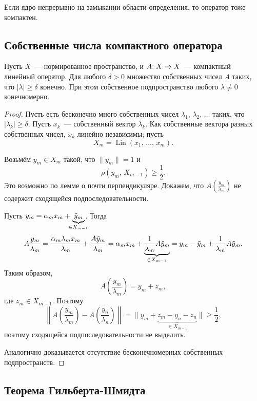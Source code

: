 \documentclass{notes}
\DeclareMathOperator{\Lin}{Lin}
\begin{document}
	\begin{exm}
		Если ядро непрерывно на замыкании области определения, то оператор тоже компактен.
	\end{exm}

\subsection{Собственные числа компактного оператора}

	\begin{thm}
		Пусть $X$~--- нормированное пространство, и $A \text{\text{:}} \; X \to X$~--- компактный линейный оператор. Для любого $\delta > 0$ множество собственных чисел $A$ таких, что $|\lambda| \geqslant \delta$ конечно. При этом собственное подпространство любого $\lambda \neq 0$ конечномерно.
		\begin{proof}
			Пусть есть бесконечно много собственных чисел $\lambda_1, \, \lambda_2, \, \ldots$ таких, что $|\lambda_k| \geqslant \delta$. Пусть $x_k$~--- собственный вектор $\lambda_k$. Как собственные вектора разных собственных чисел, $x_k$ линейно независимы; пусть
			\[
				X_m = \Lin(x_1, \, \ldots, \, x_m).
			\]

			Возьмём $y_m \in X_m$ такой, что $\|y_m\| = 1$ и 
			\[
				\rho(y_m, \, X_{m - 1}) \geqslant \dfrac{1}{2}.
			\]
			Это возможно по лемме о почти перпендикуляре. Докажем, что $A\left(\tfrac{y_m}{\lambda_m}\right)$ не содержит сходящейся подпоследовательности. 

			Пусть $y_m = \alpha_m x_m + \underbrace{\tilde{y}_m}_{\mathclap{\in X_{m - 1}}}$. Тогда
			\[
				A \dfrac{y_m}{\lambda_m} = \dfrac{\alpha_m \lambda_m x_m}{\lambda_m} + \dfrac{A \tilde{y}_m}{\lambda_m} = \alpha_m x_m + \underbrace{\dfrac{1}{\lambda_m} A \tilde{y}_m}_{\mathclap{\in X_{m-1}}} = y_m - \tilde{y}_m + \dfrac{1}{\lambda_m} A \tilde{y}_m.
			\]
			Таким образом, 
			\[
				A\left(\dfrac{y_m}{\lambda_m}\right) = y_m + z_m,
			\]
			где $z_m \in X_{m - 1}$. Поэтому
			\[
				\left\|A\left(\dfrac{y_m}{\lambda_m}\right) - A\left(\dfrac{y_n}{\lambda_n}\right)\right\| = \|y_m + \underbrace{z_m - y_n - z_n}_{\in X_{m - 1}}\| \geqslant \dfrac{1}{2},
			\]
			поэтому сходящейся подпоследовательности не выделить.

			Аналогично доказывается отсутствие бесконечномерных собственных подпространств.
		\end{proof}
	\end{thm}

\subsection{Теорема Гильберта-Шмидта}
\end{document}
